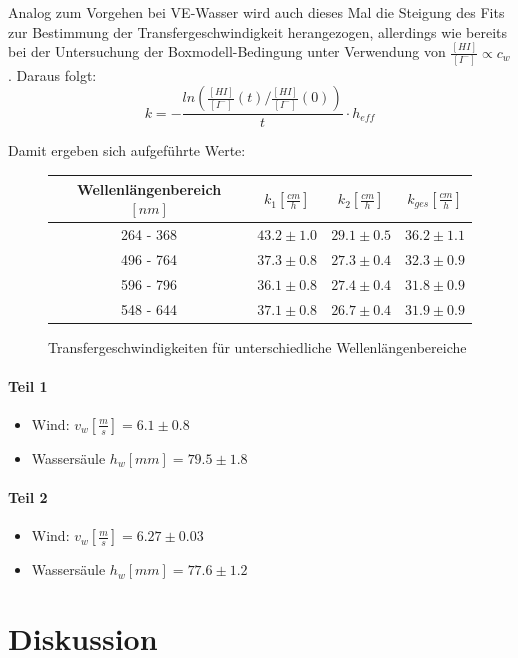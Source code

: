 \documentclass[12pt]{article}
\begin{document}
Analog zum Vorgehen bei VE-Wasser wird auch dieses Mal die Steigung des Fits zur Bestimmung der Transfergeschwindigkeit
herangezogen, allerdings wie bereits bei der Untersuchung der Boxmodell-Bedingung unter Verwendung von $\frac{[HI]}{[I^-]} \propto c_w $.
Daraus folgt:
\begin{equation}
k = - \frac{ln(\frac{[HI]}{[I^-]}(t)/\frac{[HI]}{[I^-]}(0))}{t} \cdot h_{eff}
\end{equation}

Damit ergeben sich aufgeführte Werte:

\begin{figure}[H]
	\centering
	\begin{tabular}{c|c|c|c}
		Wellenlängenbereich $[nm]$ & $k_1 [\frac{cm}{h}]$ & $k_2 [\frac{cm}{h}]$ & $k_{ges} [\frac{cm}{h}] $ \\ \hline
		264 - 368 & $43.2 \pm 1.0$ & $29.1 \pm 0.5$ & $36.2 \pm 1.1$ \\
		496 - 764 & $37.3 \pm 0.8$ & $27.3 \pm 0.4$ & $32.3 \pm 0.9$ \\
		596 - 796 & $36.1 \pm 0.8$ & $27.4 \pm 0.4$ & $31.8 \pm 0.9$ \\
		548 - 644 & $37.1 \pm 0.8$ & $26.7 \pm 0.4$ & $31.9 \pm 0.9$
	\end{tabular}
	\caption{Transfergeschwindigkeiten für unterschiedliche Wellenlängenbereiche}
\end{figure}

\paragraph{Teil 1}
\begin{itemize}
	\item Wind: $v_w [\frac{m}{s}] = 6.1 \pm 0.8 $
	\item Wassersäule $h_w[mm] = 79.5 \pm 1.8 $
\end{itemize}
\paragraph{Teil 2}
\begin{itemize}
	\item Wind: $v_w [\frac{m}{s}] = 6.27 \pm 0.03 $
	\item Wassersäule $h_w[mm] = 77.6 \pm 1.2 $
\end{itemize}

\section{Diskussion}\label{sec:Diskussion}
\end{document}
